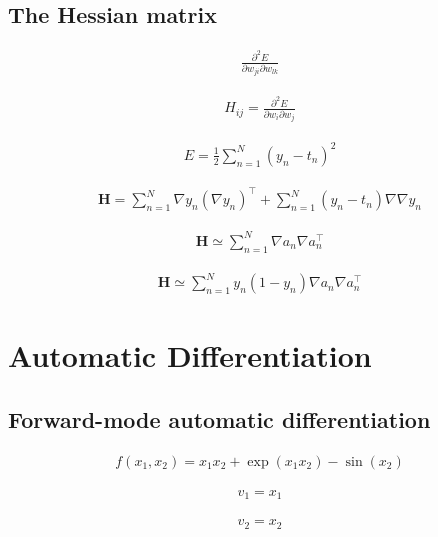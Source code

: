\documentclass{article}
\begin{document}
\subsection{The Hessian matrix}

\begin{align*}
\frac{\partial^{2} E}{\partial w_{j i} \partial w_{l k}} \tag{8.36}
\end{align*}

\begin{align*}
H_{i j} = \frac{\partial^{2} E}{\partial w_{i} \partial w_{j}} \tag{8.37}
\end{align*}

\begin{align*}
E = \frac{1}{2} \sum_{n=1}^{N} \left( y_{n} - t_{n} \right)^{2} \tag{8.38}
\end{align*}

\begin{align*}
\mathbf{H} = \sum_{n=1}^{N} \nabla y_{n} \left( \nabla y_{n} \right)^{\top} + \sum_{n=1}^{N} \left( y_{n} - t_{n} \right) \nabla \nabla y_{n} \tag{8.39}
\end{align*}

\begin{align*}
\mathbf{H} \simeq \sum_{n=1}^{N} \nabla a_{n} \nabla a_{n}^{\top} \tag{8.40}
\end{align*}

\begin{align*}
\mathbf{H} \simeq \sum_{n=1}^{N} y_{n}(1 - y_{n}) \nabla a_{n} \nabla a_{n}^{\top} \tag{8.41}
\end{align*}

\section{Automatic Differentiation}

\subsection{Forward-mode automatic differentiation}

\begin{align*}
f(x_1, x_2) = x_1 x_2 + \exp(x_1 x_2) - \sin(x_2) \tag{8.49}
\end{align*}

\begin{align*}
v_1 = x_1 \tag{8.50}
\end{align*}

\begin{align*}
v_2 = x_2 \tag{8.51}
\end{align*}
\end{document}
